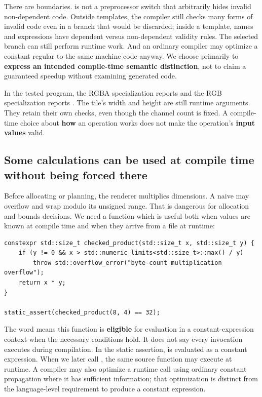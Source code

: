 There are boundaries.  is not a preprocessor switch that arbitrarily hides invalid non-dependent code. Outside templates, the compiler still checks many forms of invalid code even in a branch that would be discarded; inside a template, names and expressions have dependent versus non-dependent validity rules. The selected branch can still perform runtime work. And an ordinary compiler may optimize a constant regular  to the same machine code anyway. We choose  primarily to \textbf{express an intended compile-time semantic distinction}, not to claim a guaranteed speedup without examining generated code.

In the tested program, the RGBA specialization reports  and the RGB specialization reports . The tile's width and height are still runtime arguments. They retain their own checks, even though the channel count is fixed. A compile-time choice about \textbf{how} an operation works does not make the operation's \textbf{input values} valid.

\subsection{Some calculations can be used at compile time without being forced there}\label{01-foundations-i-ch005-some-calculations-can-be-used-at-compile-time-without-being-forced-there}

\hypertarget{01-foundations-i-ch005-some-calculations-can-be-used-at-compile-time-without-being-forced-there}{}

Before allocating or planning, the renderer multiplies dimensions. A naive  may overflow  and wrap modulo its unsigned range. That is dangerous for allocation and bounds decisions. We need a function which is useful both when values are known at compile time and when they arrive from a file at runtime:

\begin{verbatim}
constexpr std::size_t checked_product(std::size_t x, std::size_t y) {
    if (y != 0 && x > std::numeric_limits<std::size_t>::max() / y)
        throw std::overflow_error("byte-count multiplication overflow");
    return x * y;
}

static_assert(checked_product(8, 4) == 32);
\end{verbatim}

The word  means this function is \textbf{eligible} for evaluation in a constant-expression context when the necessary conditions hold. It does not say every invocation executes during compilation. In the static assertion,  is evaluated as a constant expression. When we later call , the same source function may execute at runtime. A compiler may also optimize a runtime call using ordinary constant propagation where it has sufficient information; that optimization is distinct from the language-level requirement to produce a constant expression.

